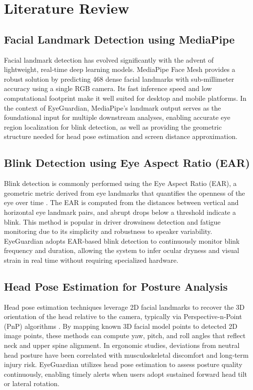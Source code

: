 \documentclass[12pt]{report}
\begin{document}

\chapter{Literature Review}

\section{Facial Landmark Detection using MediaPipe}
Facial landmark detection has evolved significantly with the advent of lightweight, real‑time deep learning models. MediaPipe Face Mesh \cite{lugaresi2019mediapipe} provides a robust solution by predicting 468 dense facial landmarks with sub‑millimeter accuracy using a single RGB camera. Its fast inference speed and low computational footprint make it well suited for desktop and mobile platforms. In the context of EyeGuardian, MediaPipe’s landmark output serves as the foundational input for multiple downstream analyses, enabling accurate eye region localization for blink detection, as well as providing the geometric structure needed for head pose estimation and screen distance approximation.

\section{Blink Detection using Eye Aspect Ratio (EAR)}
Blink detection is commonly performed using the Eye Aspect Ratio (EAR), a geometric metric derived from eye landmarks that quantifies the openness of the eye over time \cite{sousa2016real}. The EAR is computed from the distances between vertical and horizontal eye landmark pairs, and abrupt drops below a threshold indicate a blink. This method is popular in driver drowsiness detection and fatigue monitoring due to its simplicity and robustness to speaker variability. EyeGuardian adopts EAR-based blink detection to continuously monitor blink frequency and duration, allowing the system to infer ocular dryness and visual strain in real time without requiring specialized hardware.

\section{Head Pose Estimation for Posture Analysis}
Head pose estimation techniques leverage 2D facial landmarks to recover the 3D orientation of the head relative to the camera, typically via Perspective‑n‑Point (PnP) algorithms \cite{hu2017realtime}. By mapping known 3D facial model points to detected 2D image points, these methods can compute yaw, pitch, and roll angles that reflect neck and upper spine alignment. In ergonomic studies, deviations from neutral head posture have been correlated with musculoskeletal discomfort and long‑term injury risk. EyeGuardian utilizes head pose estimation to assess posture quality continuously, enabling timely alerts when users adopt sustained forward head tilt or lateral rotation.
\end{document}
